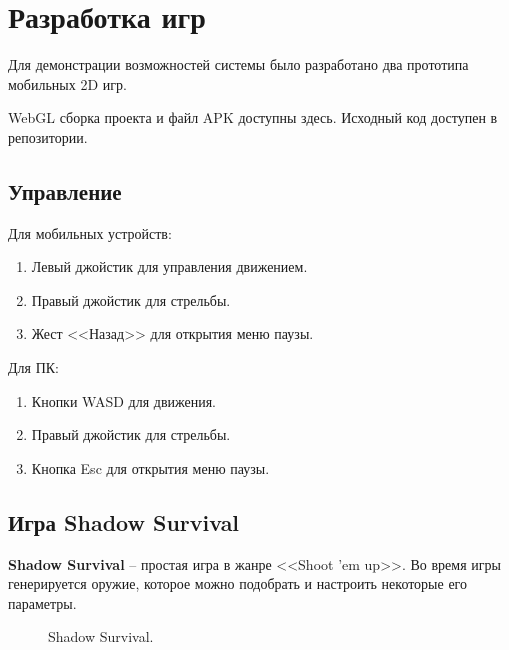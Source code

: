 ﻿%
\section{Разработка игр}

Для демонстрации возможностей системы было разработано два прототипа мобильных 2D игр. 

WebGL сборка проекта и файл APK доступны здесь\cite{s9}. Исходный код доступен в репозитории\cite{s7}.

\subsection{Управление}

{\parindent0pt Для мобильных устройств:}
\begin{enumerate}[label=\textbullet]
    \item Левый джойстик для управления движением.
    \item Правый джойстик для стрельбы.
    \item Жест <<Назад>> для открытия меню паузы.
\end{enumerate}
{\parindent0pt Для ПК:}
\begin{enumerate}[label=\textbullet]
    \item Кнопки WASD для движения.
    \item Правый джойстик для стрельбы.
    \item Кнопка Esc для открытия меню паузы.
\end{enumerate}

\subsection{Игра Shadow Survival}

\textbf{Shadow Survival} -- простая игра в жанре <<Shoot ’em up>>. Во время игры генерируется оружие, которое можно подобрать и настроить некоторые его параметры.

\begin{figure}[ht]
    \begin{center}

        \caption{
            \label{ShadowSurvival}
            Shadow Survival.
        }
    \end {center}
\end {figure}

